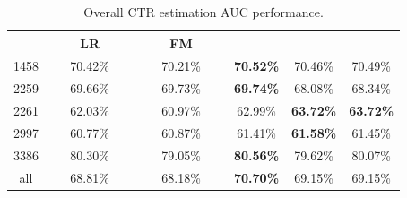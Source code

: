 \documentclass{llncs}
\newcommand{\fmnn}{\text{FNN}}
\newcommand{\snnrbm}{\text{SNN-RBM}}
\newcommand{\snndae}{\text{SNN-DAE}}
\begin{document}


\begin{table}[t]
\centering
\vspace{-30pt}
\caption{Overall CTR estimation AUC performance.}\label{tab:performance}
\begin{tabular}{c|ccccc}
& ~~~~LR~~~~ & ~~~~FM~~~~ & ~~~\fmnn~~~ & \snndae & \snnrbm\\ \hline
1458 & 70.42\% & 70.21\% & \textbf{70.52\%} & 70.46\% & 70.49\% \\
2259 & 69.66\% & 69.73\% & \textbf{69.74\%} & 68.08\% & 68.34\% \\
2261 & 62.03\% & 60.97\% & 62.99\% & \textbf{63.72\%} & \textbf{63.72\%} \\
2997 & 60.77\% & 60.87\% & 61.41\% & \textbf{61.58\%} & 61.45\% \\
3386 & 80.30\% & 79.05\% & \textbf{80.56\%} & 79.62\% & 80.07\% \\
all  & 68.81\% & 68.18\% & \textbf{70.70\%} & 69.15\% & 69.15\% \\
\end{tabular}
\end{table}
\end{document}
